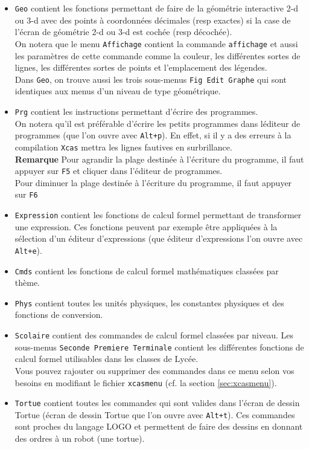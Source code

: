 \documentclass[a4paper,11pt]{article}
\begin{document}
\begin{itemize}
\item
{\tt Geo}
contient les fonctions permettant de faire de la g\'eom\'etrie interactive 2-d 
ou 3-d avec des points \`a coordonn\'ees d\'ecimales (resp exactes) si 
la case \framebox{$\sim$} de l'\'ecran de g\'eom\'etrie 2-d 
ou 3-d est coch\'ee (resp d\'ecoch\'ee).\\
On notera que le menu {\tt Affichage} contient  la commande 
{\tt affichage} et aussi les param\`etres de cette commande comme la couleur, 
les diff\'erentes sortes de lignes, les diff\'erentes sortes de points et 
l'emplacement des l\'egendes. \\ 
 Dans {\tt Geo}, on trouve aussi les trois 
sous-menus {\tt Fig Edit Graphe}  qui sont identiques aux menus d'un niveau de
type g\'eom\'etrique.\\
\item 
{\tt Prg}
contient les instructions permettant d'\'ecrire des programmes.\\
On notera qu'il est pr\'ef\'erable d'\'ecrire les petits programmes dans 
l\'editeur de programmes (que l'on ouvre avec {\tt Alt+p}). En effet, si il y a
des erreurs \`a la compilation {\tt Xcas} mettra les lignes fautives en 
surbrillance.\\
{\bf Remarque}
Pour agrandir la plage destin\'ee \`a l'\'ecriture du programme, il faut 
appuyer sur {\tt F5} et cliquer dans l'\'editeur de programmes.\\
Pour diminuer la plage destin\'ee \`a l'\'ecriture du programme, il faut 
appuyer sur {\tt F6}  
\item
{\tt Expression}
contient les fonctions de calcul formel permettant de transformer
une expression. Ces fonctions peuvent par exemple \^etre appliqu\'ees
\`a la s\'election d'un \'editeur d'expressions (que \'editeur d'expressions 
l'on ouvre avec {\tt Alt+e}).
\item
{\tt Cmds}
contient les fonctions de calcul formel math\'ematiques class\'ees par th\`eme.

\item
{\tt Phys}
contient toutes les unit\'es physiques, les constantes physiques et des 
fonctions de conversion.

\item
{\tt Scolaire}
contient des commandes de calcul formel class\'ees par niveau. Les sous-menus 
{\tt Seconde Premiere Terminale} contient les diff\'erentes fonctions de calcul
formel utilisables dans les classes de Lyc\'ee.\\ 
Vous pouvez rajouter ou supprimer des commandes dans ce menu 
selon vos besoins en modifiant le fichier {\tt xcasmenu} (cf. la
section \ref{sec:xcasmenu}).

\item
{\tt Tortue} contient  toutes les commandes qui sont valides dans l'\'ecran de 
dessin Tortue  (\'ecran de dessin Tortue que l'on ouvre avec 
{\tt Alt+t}). Ces commandes sont proches du langage LOGO et permettent de faire
des dessins en donnant des ordres \`a un robot (une tortue).


\end{itemize}
\end{document}
